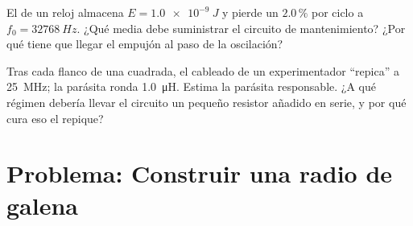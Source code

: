 \begin{exercise}[$\star\star\star$]\label{exo:g12:rlc-oscillations:14}
El  de un reloj almacena $E = \qty{1.0e-9}{J}$ y pierde un $2.0\,\%$ por
ciclo a $f_0 = \qty{32768}{Hz}$. ¿Qué  media debe suministrar el circuito de
mantenimiento? ¿Por qué tiene que llegar el empujón al paso de la oscilación?
\end{exercise}

\begin{exercise}[$\star\star\star$]\label{exo:g12:rlc-oscillations:15}
Tras cada flanco de una  cuadrada, el cableado de un experimentador ``repica'' a
\qty{25}{MHz}; la  parásita ronda \qty{1.0}{\micro H}. Estima la
 parásita responsable. ¿A qué régimen debería llevar el circuito un pequeño
resistor añadido en serie, y por qué cura eso el repique?
\end{exercise}

\section{Problema: Construir una radio de galena}

